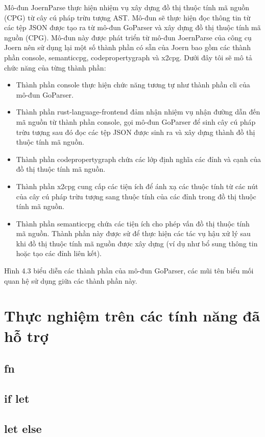 Mô-đun JoernParse thực hiện nhiệm vụ xây dựng đồ thị thuộc tính mã nguồn (CPG)
từ cây cú pháp trừu tượng AST. Mô-đun sẽ thực hiện đọc thông tin từ các tệp JSON được
tạo ra từ mô-đun GoParser và xây dựng đồ thị thuộc tính mã nguồn (CPG). Mô-đun này
được phát triển từ mô-đun JoernParse của công cụ Joern nên sử dụng lại một số thành
phần có sẵn của Joern bao gồm các thành phần console, semanticcpg, codepropertygraph
và x2cpg. Dưới đây tôi sẽ mô tả chức năng của từng thành phần:
\begin{itemize}
\item Thành phần console thực hiện chức năng tương tự như thành phần cli của mô-đun
GoParser.
\item Thành phần rust-language-frontend đảm nhận nhiệm vụ nhận đường dẫn đến mã nguồn từ thành phần console, gọi mô-đun GoParser để sinh cây cú pháp trừu tượng sau đó đọc các tệp JSON được sinh ra và xây dựng thành đồ thị thuộc tính mã nguồn.
\item Thành phần codepropertygraph chứa các lớp định nghĩa các đỉnh và cạnh của đồ thị thuộc tính mã nguồn.
\item Thành phần x2cpg cung cấp các tiện ích để ánh xạ các thuộc tính từ các nút của cây cú pháp trừu tượng sang thuộc tính của các đỉnh trong đồ thị thuộc tính mã nguồn.
\item Thành phần semanticcpg chứa các tiện ích cho phép vấn đồ thị thuộc tính mã nguồn. Thành phần này được sử để thực hiện các tác vụ hậu xử lý sau khi đồ thị thuộc tính mã nguồn được xây dựng (ví dụ như bổ sung thông tin hoặc tạo các đỉnh liên kết).
\end{itemize}

Hình 4.3 biểu diễn các thành phần của mô-đun GoParser, các mũi tên biểu mối
quan hệ sử dụng giữa các thành phần này.

\section{Thực nghiệm trên các tính năng đã hỗ trợ}

\subsection{fn}

\subsection{if let}

\subsection{let else}

